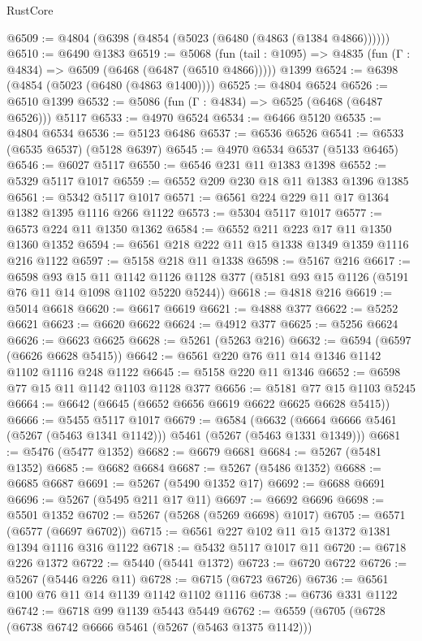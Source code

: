 \begin{lexlean}{RustCore}
\begin{coremodule}
@6509 := @4804 (@6398 (@4854 (@5023 (@6480 (@4863 (@1384 @4866))))))
@6510 := @6490 @1383
@6519 := @5068
    (fun (tail : @1095) => @4835 (fun (Γ : @4834) => @6509 (@6468 (@6487 (@6510 @4866)))))
    @1399
@6524 := @6398 (@4854 (@5023 (@6480 (@4863 @1400))))
@6525 := @4804 @6524
@6526 := @6510 @1399
@6532 := @5086 (fun (Γ : @4834) => @6525 (@6468 (@6487 @6526))) @5117
@6533 := @4970 @6524
@6534 := @6466 @5120
@6535 := @4804 @6534
@6536 := @5123 @6486
@6537 := @6536 @6526
@6541 := @6533 (@6535 @6537) (@5128 @6397)
@6545 := @4970 @6534 @6537 (@5133 @6465)
@6546 := @6027 @5117
@6550 := @6546 @231 @11 @1383 @1398
@6552 := @5329 @5117 @1017
@6559 := @6552 @209 @230 @18 @11 @1383 @1396 @1385
@6561 := @5342 @5117 @1017
@6571 := @6561 @224 @229 @11 @17 @1364 @1382 @1395 @1116 @266 @1122
@6573 := @5304 @5117 @1017
@6577 := @6573 @224 @11 @1350 @1362
@6584 := @6552 @211 @223 @17 @11 @1350 @1360 @1352
@6594 := @6561 @218 @222 @11 @15 @1338 @1349 @1359 @1116 @216 @1122
@6597 := @5158 @218 @11 @1338
@6598 := @5167 @216
@6617 := @6598
    @93
    @15
    @11
    @1142
    @1126
    @1128
    @377
    (@5181 @93 @15 @1126 (@5191 @76 @11 @14 @1098 @1102 @5220 @5244))
@6618 := @4818 @216
@6619 := @5014 @6618
@6620 := @6617 @6619
@6621 := @4888 @377
@6622 := @5252 @6621
@6623 := @6620 @6622
@6624 := @4912 @377
@6625 := @5256 @6624
@6626 := @6623 @6625
@6628 := @5261 (@5263 @216)
@6632 := @6594 (@6597 (@6626 @6628 @5415))
@6642 := @6561 @220 @76 @11 @14 @1346 @1142 @1102 @1116 @248 @1122
@6645 := @5158 @220 @11 @1346
@6652 := @6598 @77 @15 @11 @1142 @1103 @1128 @377
@6656 := @5181 @77 @15 @1103 @5245
@6664 := @6642 (@6645 (@6652 @6656 @6619 @6622 @6625 @6628 @5415))
@6666 := @5455 @5117 @1017
@6679 := @6584
    (@6632 (@6664 @6666 @5461 (@5267 (@5463 @1341 @1142))) @5461 (@5267 (@5463 @1331 @1349)))
@6681 := @5476 (@5477 @1352)
@6682 := @6679 @6681
@6684 := @5267 (@5481 @1352)
@6685 := @6682 @6684
@6687 := @5267 (@5486 @1352)
@6688 := @6685 @6687
@6691 := @5267 (@5490 @1352 @17)
@6692 := @6688 @6691
@6696 := @5267 (@5495 @211 @17 @11)
@6697 := @6692 @6696
@6698 := @5501 @1352
@6702 := @5267 (@5268 (@5269 @6698) @1017)
@6705 := @6571 (@6577 (@6697 @6702))
@6715 := @6561 @227 @102 @11 @15 @1372 @1381 @1394 @1116 @316 @1122
@6718 := @5432 @5117 @1017 @11
@6720 := @6718 @226 @1372
@6722 := @5440 (@5441 @1372)
@6723 := @6720 @6722
@6726 := @5267 (@5446 @226 @11)
@6728 := @6715 (@6723 @6726)
@6736 := @6561 @100 @76 @11 @14 @1139 @1142 @1102 @1116
@6738 := @6736 @331 @1122
@6742 := @6718 @99 @1139 @5443 @5449
@6762 := @6559
    (@6705
      (@6728
        (@6738 @6742 @6666 @5461 (@5267 (@5463 @1375 @1142)))

\end{coremodule}
\end{lexlean}
